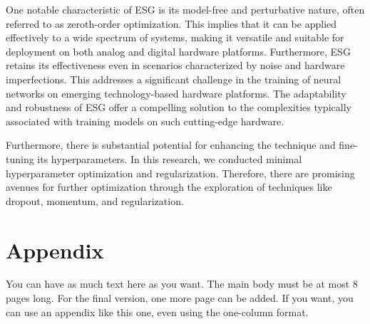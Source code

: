 \documentclass[nohyperref]{article}
\theoremstyle{plain}
\theoremstyle{definition}
\theoremstyle{remark}
\begin{document}
One notable characteristic of ESG is its model-free and perturbative nature, often referred to as zeroth-order optimization. This implies that it can be applied effectively to a wide spectrum of systems, making it versatile and suitable for deployment on both analog and digital hardware platforms. Furthermore, ESG retains its effectiveness even in scenarios characterized by noise and hardware imperfections. This addresses a significant challenge in the training of neural networks on emerging technology-based hardware platforms. The adaptability and robustness of ESG offer a compelling solution to the complexities typically associated with training models on such cutting-edge hardware.

Furthermore, there is substantial potential for enhancing the technique and fine-tuning its hyperparameters. In this research, we conducted minimal hyperparameter optimization and regularization. Therefore, there are promising avenues for further optimization through the exploration of techniques like dropout, momentum, and regularization.






\newpage
\appendix
\onecolumn
\section{Appendix}

You can have as much text here as you want. The main body must be at most $8$ pages long.
For the final version, one more page can be added.
If you want, you can use an appendix like this one, even using the one-column format.
\end{document}
